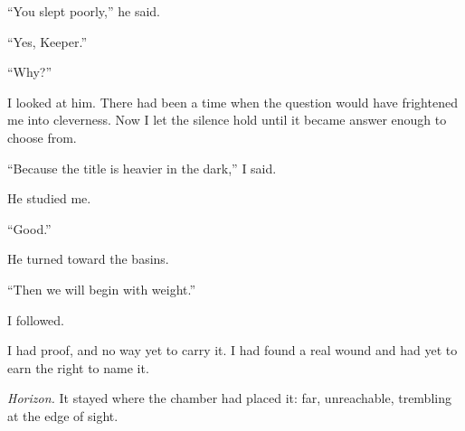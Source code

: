 ``You slept poorly,'' he said.\par

``Yes, Keeper.''\par

``Why?''\par

I looked at him. There had been a time when the question would have frightened me into cleverness. Now I let the silence hold until it became answer enough to choose from.\par

``Because the title is heavier in the dark,'' I said.\par

He studied me.\par

``Good.''\par

He turned toward the basins.\par

``Then we will begin with weight.''\par

I followed.\par

I had proof, and no way yet to carry it. I had found a real wound and had yet to earn the right to name it.\par

\textit{Horizon.} It stayed where the chamber had placed it: far, unreachable, trembling at the edge of sight.\par

\ornament
